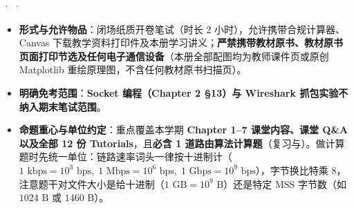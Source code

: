 

 ·  · 



\begin{itemize}
\item \textbf{形式与允许物品}：闭场纸质开卷笔试（时长 2 小时），允许携带合规计算器、Canvas 下载教学资料打印件及本册学习讲义；\textbf{严禁携带教材原书、教材原书页面打印节选及任何电子通信设备}（本册全部配图均为教师课件页或原创 Matplotlib 重绘原理图，不含任何教材原书扫描页）。
\item \textbf{明确免考范围}：\textbf{Socket 编程（Chapter 2 §13）与 Wireshark 抓包实验不纳入期末笔试范围}。
\item \textbf{命题重心与单位约定}：重点覆盖本学期 \textbf{Chapter 1–7 课堂内容、课堂 Q\&A 以及全部 12 份 Tutorials}，且\textbf{必含 1 道路由算法计算题}（复习与）。做计算题时先统一单位：链路速率词头一律按十进制计（$1\text{ kbps}=10^3\text{ bps},\; 1\text{ Mbps}=10^6\text{ bps},\; 1\text{ Gbps}=10^9\text{ bps}$），字节换比特乘 $8$，注意题干对文件大小是给十进制（$1\text{ GB}=10^9\text{ B}$）还是特定 $\mathrm{MSS}$ 字节数（如 $1024\text{ B}$ 或 $1460\text{ B}$）。
\end{itemize}



